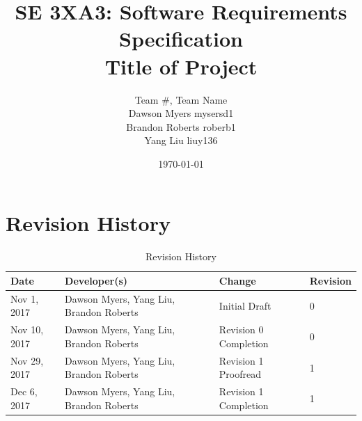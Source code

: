\documentclass[12pt, titlepage]{article}
\title{SE 3XA3: Software Requirements Specification\\Title of Project}
\author{Team \#, Team Name
		\\ Dawson Myers mysersd1
		\\ Brandon Roberts roberb1
		\\ Yang Liu liuy136
}
\date{\today}
\newcommand{\revisionTable}{

\begin{table}[hp]
\caption{Revision History} \label{TblRevisionHistory}
\begin{tabularx}{\textwidth}{lXlX}
\toprule
\textbf{Date} & \textbf{Developer(s)} & \textbf{Change} & \textbf{Revision}\\
\midrule
Nov​ ​1,​ ​2017 & Dawson Myers, Yang Liu, Brandon Roberts & Initial Draft & 0\\
\hline
Nov 10,​ ​2017 & Dawson Myers, Yang Liu, Brandon Roberts & Revision​ ​0​ ​Completion & 0\\
\hline
Nov​ ​29,​ ​2017 & Dawson Myers, Yang Liu, Brandon Roberts & Revision​ ​1 Proofread & 1\\
\hline
Dec 6,​ ​2017 & Dawson Myers, Yang Liu, Brandon Roberts & Revision​ ​1 Completion & 1\\
\hline
\bottomrule
\end{tabularx}
\end{table}
}
\begin{document}
%
%
%
%








\def\thesection{\arabic{section}} 
\renewcommand\thesection{\arabic{section}} 
\renewcommand\thesubsection{\thesection.\arabic{subsection}}

\tableofcontents

\listoftables

\listoffigures


\newpage

\section{Revision History}
\revisionTable


\end{document}
